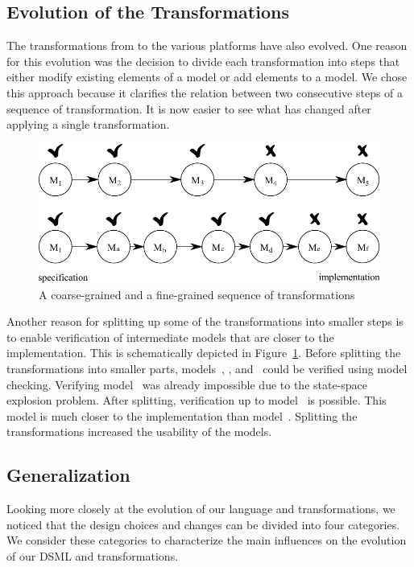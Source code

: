 \subsection{Evolution of the Transformations}
\label{subsec:iterative-dsl-evolution:trafo}
The transformations from \SLCO to the various platforms have also evolved.
One reason for this evolution was the decision to divide each transformation into steps that either modify existing elements of a model or add elements to a model.
We chose this approach because it clarifies the relation between two consecutive steps of a sequence of transformation.
It is now easier to see what has changed after applying a single transformation.

\begin{figure}[hbt]
 \centering
 \includegraphics[width=.7\columnwidth]{iterative-dsl-evolution/figs/fine-grained-transformations}
 \caption{A coarse-grained and a fine-grained sequence of transformations}
 \label{fig:iterative-dsl-evolution:fine-grained-transformations}
\end{figure}

Another reason for splitting up some of the transformations into smaller steps is to enable verification of intermediate models that are closer to the implementation.
This is schematically depicted in Figure~\ref{fig:iterative-dsl-evolution:fine-grained-transformations}.
Before splitting the transformations into smaller parts, models~, , and~ could be verified using model checking.
Verifying model~ was already impossible due to the state-space explosion problem.
After splitting, verification up to model~ is possible.
This model is much closer to the implementation than model~.
Splitting the transformations increased the usability of the models.

\subsection{Generalization}
Looking more closely at the evolution of our language and transformations, we noticed that the design choices and changes can be divided into four categories.
We consider these categories to characterize the main influences on the evolution of our DSML and transformations.

